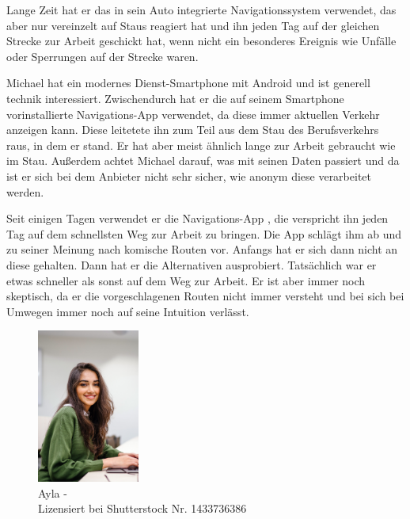 Lange Zeit hat er das in sein Auto integrierte Navigationssystem verwendet, das aber nur vereinzelt auf Staus reagiert hat und ihn jeden Tag auf der gleichen Strecke zur Arbeit geschickt hat, wenn nicht ein besonderes Ereignis wie Unfälle oder Sperrungen auf der Strecke waren.

Michael hat ein modernes Dienst-Smartphone mit Android und ist generell technik interessiert. Zwischendurch hat er die auf seinem Smartphone vorinstallierte Navigations-App verwendet, da diese immer aktuellen Verkehr anzeigen kann. Diese leitetete ihn zum Teil aus dem Stau des Berufsverkehrs raus, in dem er stand. Er hat aber meist ähnlich lange zur Arbeit gebraucht wie im Stau. Außerdem achtet Michael darauf, was mit seinen Daten passiert und da ist er sich bei dem Anbieter nicht sehr sicher, wie anonym diese verarbeitet werden.

Seit einigen Tagen verwendet er die Navigations-App , die verspricht ihn jeden Tag auf dem schnellsten Weg zur Arbeit zu bringen. Die App schlägt ihm ab und zu seiner Meinung nach \glqq komische\grqq{} Routen vor. Anfangs hat er sich dann nicht an diese gehalten. Dann hat er die Alternativen ausprobiert. Tatsächlich war er etwas schneller als sonst auf dem Weg zur Arbeit. Er ist aber immer noch skeptisch, da er die vorgeschlagenen Routen nicht immer versteht und bei sich bei Umwegen immer noch auf seine Intuition verlässt.

\bigbreak

\begin{figure}
    \vspace{-\intextsep}
    \centering
    \includegraphics[width=0.3\textwidth]{contents/06_model_evaluation/01_integration/res/persona_picture_ayla.png}
    \caption{Ayla -\\Lizensiert bei Shutterstock Nr. 1433736386}
\end{figure}

